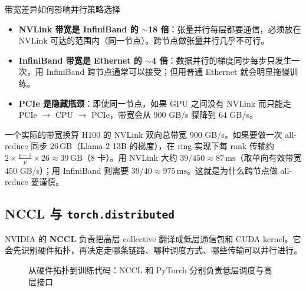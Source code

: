 \documentclass[a4paper]{article}
\begin{document}
\begin{importantbox}{带宽差异如何影响并行策略选择}
\begin{itemize}
    \item \textbf{NVLink 带宽是 InfiniBand 的 $\sim$18 倍}：张量并行每层都要通信，必须放在 NVLink 可达的范围内（同一节点）。跨节点做张量并行几乎不可行。
    \item \textbf{InfiniBand 带宽是 Ethernet 的 $\sim$4 倍}：数据并行的梯度同步每步只发生一次，用 InfiniBand 跨节点通常可以接受；但用普通 Ethernet 就会明显拖慢训练。
    \item \textbf{PCIe 是隐藏瓶颈}：即使同一节点，如果 GPU 之间没有 NVLink 而只能走 PCIe $\to$ CPU $\to$ PCIe，带宽会从 900 GB/s 骤降到 64 GB/s。
\end{itemize}
\end{importantbox}

\begin{knowledgebox}{一个实际的带宽换算}
H100 的 NVLink 双向总带宽 900 GB/s。如果要做一次 all-reduce 同步 $26\,\text{GB}$（Llama 2 13B 的梯度），在 ring 实现下每 rank 传输约 $2 \times \frac{p-1}{p} \times 26 \approx 39\,\text{GB}$（8 卡）。用 NVLink 大约 $39/450 \approx 87\,\text{ms}$（取单向有效带宽 450 GB/s）；用 InfiniBand 则需要 $39/40 \approx 975\,\text{ms}$。这就是为什么跨节点做 all-reduce 要谨慎。
\end{knowledgebox}

\subsection{NCCL 与 \texttt{torch.distributed}}

NVIDIA 的 \textbf{NCCL} 负责把高层 collective 翻译成低层通信包和 CUDA kernel。它会先识别硬件拓扑，再决定走哪条链路、哪种调度方式、哪些传输可以并行进行。

\begin{figure}[H]
\centering
{}
\caption{从硬件拓扑到训练代码：NCCL 和 PyTorch 分别负责低层调度与高层接口}
\end{figure}
\end{document}
